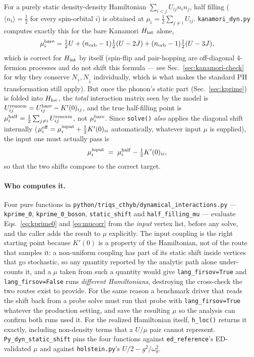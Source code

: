 \documentclass[a4paper,12pt]{article}
\newcommand{\w}{\ensuremath{\omega}}
\newcommand{\Hloc}{\ensuremath{H_{\rm loc}}}
\begin{document}
For a purely static density-density Hamiltonian $\sum_{i<j}U_{ij}n_in_j$, half filling
($\langle n_i\rangle=\tfrac12$ for every spin-orbital $i$) is obtained at
$\mu_i = \tfrac12\sum_{j\neq i}U_{ij}$. \texttt{kanamori\_dyn.py} computes exactly this
for the bare Kanamori $H_{\rm int}$ alone,
\begin{equation}
  \mu_i^{\rm bare} = \tfrac12 U + (n_{\rm orb}-1)\tfrac12(U-2J) + (n_{\rm orb}-1)\tfrac12(U-3J),
\end{equation}
which is correct for $H_{\rm int}$ by itself (spin-flip and pair-hopping are
off-diagonal 4-fermion processes and do not shift this formula --- see
Sec.~\ref{sec:kanamori-check} for why they conserve $N_\uparrow,N_\downarrow$
individually, which is what makes the standard PH transformation still apply). But
once the phonon's static part (Sec.~\ref{sec:kprime}) is folded into $\Hloc$, the
\emph{total} interaction matrix seen by the model is $U^{\rm renorm}_{ij} =
U^{\rm bare}_{ij} - K'(0)_{ij}$, and the true half-filling point is
$\mu_i^{\rm half} = \tfrac12\sum_{j\neq i}U^{\rm renorm}_{ij}$, not $\mu_i^{\rm bare}$.
Since \texttt{solve()} \emph{also} applies the diagonal shift internally
($\mu_i^{\rm eff} = \mu_i^{\rm input} + \tfrac12 K'(0)_{ii}$ automatically, whatever
input $\mu$ is supplied), the input one must actually pass is
\begin{equation}
  \mu_i^{\rm input} \;=\; \mu_i^{\rm half} - \tfrac12 K'(0)_{ii},
  \label{eq:mucorr}
\end{equation}
so that the two shifts compose to the correct target.

\paragraph{Who computes it.} Four pure functions in
\texttt{python/triqs\_cthyb/dynamical\_interactions.py} --- \texttt{kprime\_0},
\texttt{kprime\_0\_boson}, \texttt{static\_shift} and \texttt{half\_filling\_mu} ---
evaluate Eqs.~\eqref{eq:kprime0} and \eqref{eq:mucorr} from the \emph{input} vertex list,
before any solve, and the caller adds the result to $\mu$ explicitly. The input coupling
is the right starting point because $K'(0)$ is a property of the Hamiltonian, not of the
route that samples it: a non-uniform coupling has part of its static shift inside vertices
that go stochastic, so any quantity reported by the analytic path alone under-counts it,
and a $\mu$ taken from such a quantity would give \texttt{lang\_firsov=True} and
\texttt{lang\_firsov=False} runs \emph{different Hamiltonians}, destroying the
cross-check the two routes exist to provide. For the same reason a benchmark driver that
reads the shift back from a probe solve must run that probe with
\texttt{lang\_firsov=True} whatever the production setting, and save the resulting $\mu$
so the analysis can confirm both runs used it. For the realized Hamiltonian itself,
\texttt{h\_loc()} returns it exactly, including non-density terms that a $U/\mu$ pair
cannot represent. \texttt{Py\_dyn\_static\_shift} pins the four functions against
\texttt{ed\_reference}'s ED-validated $\mu$ and against \texttt{holstein.py}'s
$U/2-g^2/\w_0^2$.
\end{document}
